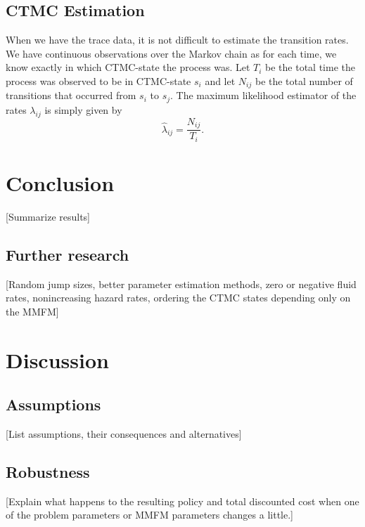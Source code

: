 \section{CTMC Estimation}
When we have the trace data, it is not difficult to estimate the transition rates.
We have continuous observations over the Markov chain as for each time, we know exactly in which CTMC-state the process was.
Let $T_i$ be the total time the process was observed to be in CTMC-state $s_i$ and let $N_{ij}$ be the total number of transitions that occurred from $s_i$ to $s_j$.
The maximum likelihood estimator of the rates $\lambda_{ij}$ is simply given by \cite{Inamura2006}
\[
\hat\lambda_{ij}=\frac{N_{ij}}{T_i}.
\]



\chapter{Conclusion}\label{chapter:Conclusion}
[Summarize results]
\section{Further research}
[Random jump sizes, better parameter estimation methods, zero or negative fluid rates, nonincreasing hazard rates, ordering the CTMC states depending only on the MMFM]

\chapter{Discussion}\label{chapter:discussion}
\section{Assumptions}
[List assumptions, their consequences and alternatives]
\section{Robustness}
[Explain what happens to the resulting policy and total discounted cost when one of the problem parameters or MMFM parameters changes a little.]




